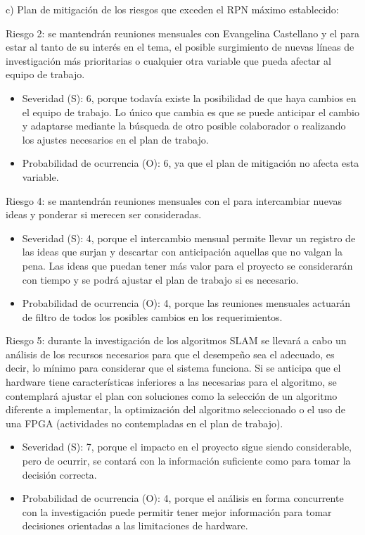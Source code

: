 \documentclass[
11pt, %
codirector, %
]{charter}
\begin{document}
c) Plan de mitigación de los riesgos que exceden el RPN máximo establecido:

Riesgo 2: se mantendrán reuniones mensuales con Evangelina Castellano y el \clientename{} para estar al tanto de su interés en el tema, el posible surgimiento de nuevas líneas de investigación más prioritarias o cualquier otra variable que pueda afectar al equipo de trabajo.
\begin{itemize}
	\item Severidad (S): 6, porque todavía existe la posibilidad de que haya cambios en el equipo de trabajo. Lo único que cambia es que se puede anticipar el cambio y adaptarse mediante la búsqueda de otro posible colaborador o realizando los ajustes necesarios en el plan de trabajo.
	\item Probabilidad de ocurrencia (O): 6, ya que el plan de mitigación no afecta esta variable.
\end{itemize}

Riesgo 4: se mantendrán reuniones mensuales con el \clientename{} para intercambiar nuevas ideas y ponderar si merecen ser consideradas.
\begin{itemize}
	\item Severidad (S): 4, porque el intercambio mensual permite llevar un registro de las ideas que surjan y descartar con anticipación aquellas que no valgan la pena. Las ideas que puedan tener más valor para el proyecto se considerarán con tiempo y se podrá ajustar el plan de trabajo si es necesario.
	\item Probabilidad de ocurrencia (O): 4, porque las reuniones mensuales actuarán de filtro de todos los posibles cambios en los requerimientos.
\end{itemize}

Riesgo 5: durante la investigación de los algoritmos SLAM se llevará a cabo un análisis de los recursos necesarios para que el desempeño sea el adecuado, es decir, lo mínimo para considerar que el sistema funciona. Si se anticipa que el hardware tiene características inferiores a las necesarias para el algoritmo, se contemplará ajustar el plan con soluciones como la selección de un algoritmo diferente a implementar, la optimización del algoritmo seleccionado o el uso de una FPGA (actividades no contempladas en el plan de trabajo).
\begin{itemize}
	\item Severidad (S): 7, porque el impacto en el proyecto sigue siendo considerable, pero de ocurrir, se contará con la información suficiente como para tomar la decisión correcta.
	\item Probabilidad de ocurrencia (O): 4, porque el análisis en forma concurrente con la investigación puede permitir tener mejor información para tomar decisiones orientadas a las limitaciones de hardware.
\end{itemize}
\end{document}
